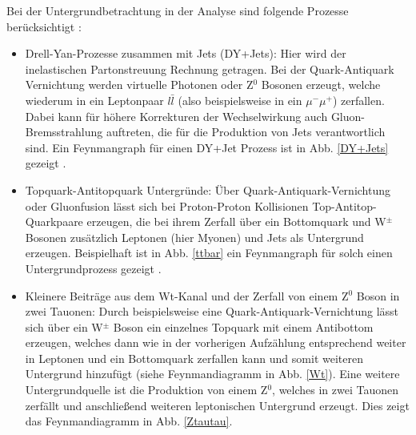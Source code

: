 Bei der Untergrundbetrachtung in der Analyse sind folgende Prozesse berücksichtigt \cite{LQATLAS}:
\begin{itemize}
    \item Drell-Yan-Prozesse zusammen mit Jets (DY+Jets): Hier wird der inelastischen Partonstreuung Rechnung getragen. Bei der Quark-Antiquark Vernichtung werden virtuelle Photonen oder Z$^0$ Bosonen erzeugt, welche wiederum in ein Leptonpaar $l\bar{l}$ (also beispielsweise in ein $\mu^-\mu^+$) zerfallen. Dabei kann für höhere Korrekturen der Wechselwirkung auch Gluon-Bremsstrahlung auftreten, die für die Produktion von Jets verantwortlich sind. Ein Feynmangraph für einen DY+Jet Prozess ist in Abb. \ref{DY+Jets} gezeigt \cite{PhysTeV}. 
    \item Topquark-Antitopquark Untergründe: Über Quark-Antiquark-Vernichtung oder Gluonfusion lässt sich bei Proton-Proton Kollisionen Top-Antitop-Quarkpaare erzeugen, die bei ihrem Zerfall über ein Bottomquark und W$^\pm$ Bosonen zu\-sätz\-lich Leptonen (hier Myonen) und Jets als Untergrund erzeugen. Beispielhaft ist in Abb. \ref{ttbar} ein Feynmangraph für solch einen Untergrundprozess gezeigt \cite{PhysTeV}.
    \item Kleinere Beiträge aus dem Wt-Kanal und der Zerfall von einem Z$^0$ Boson in zwei Tauonen: Durch beispielsweise eine Quark-Antiquark-Vernichtung lässt sich über ein W$^\pm$ Boson ein einzelnes Topquark mit einem Antibottom erzeugen, welches dann wie in der vorherigen Aufzählung entsprechend weiter in Leptonen und ein Bottomquark zerfallen kann und somit weiteren Untergrund hinzufügt (siehe Feynmandiagramm in Abb. \ref{Wt}). Eine weitere Untergrundquelle ist die Produktion von einem Z$^0$, welches in zwei Tauonen zerfällt und anschließend weiteren leptonischen Untergrund erzeugt. Dies zeigt das Feynmandiagramm in Abb. \ref{Ztautau}. 
\end{itemize}%

